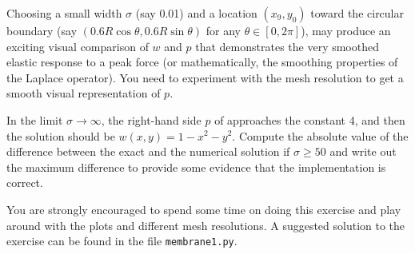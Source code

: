 Choosing a small width $\sigma$ (say 0.01)
and a location $(x_9,y_0)$ toward the circular boundary
(say $(0.6R\cos\theta, 0.6R\sin\theta)$ for any $\theta\in [0,2\pi]$),
may produce an exciting visual comparison of $w$ and $p$ that
demonstrates the very smoothed elastic response to a peak force
(or mathematically, the smoothing properties of the Laplace operator).
You need to experiment with the mesh resolution to get a smooth
visual representation of $p$.

In the limit $\sigma\rightarrow\infty$, the right-hand side $p$ of
 approaches the constant 4,
and then the solution should be $w(x,y) = 1-x^2-y^2$.
Compute the absolute value of the
difference between the exact and the numerical solution
if $\sigma \geq 50$ and write out the maximum difference
to provide some evidence that the implementation is correct.

You are strongly encouraged to spend some time on doing
this exercise and play around with
the plots and different mesh resolutions.
A suggested solution to the exercise
can be found in the file {\fontsize{12pt}{12pt}\texttt{membrane1.py}}.


